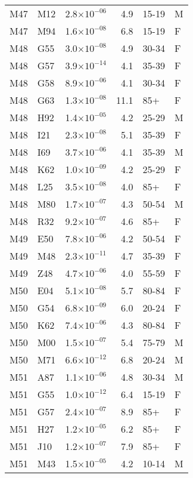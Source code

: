 \begin{longtable}{lllrll}
   M47 & M12 & 2.8$\times10^{-06}$ & 4.9 & 15-19 & M \\ 
   M47 & M94 & 1.6$\times10^{-08}$ & 6.8 & 15-19 & F \\ 
   M48 & G55 & 3.0$\times10^{-08}$ & 4.9 & 30-34 & F \\ 
   M48 & G57 & 3.9$\times10^{-14}$ & 4.1 & 35-39 & F \\ 
   M48 & G58 & 8.9$\times10^{-06}$ & 4.1 & 30-34 & F \\ 
   M48 & G63 & 1.3$\times10^{-08}$ & 11.1 & 85+ & F \\ 
   M48 & H92 & 1.4$\times10^{-05}$ & 4.2 & 25-29 & M \\ 
   M48 & I21 & 2.3$\times10^{-08}$ & 5.1 & 35-39 & F \\ 
   M48 & I69 & 3.7$\times10^{-06}$ & 4.1 & 35-39 & M \\ 
   M48 & K62 & 1.0$\times10^{-09}$ & 4.2 & 25-29 & F \\ 
   M48 & L25 & 3.5$\times10^{-08}$ & 4.0 & 85+ & F \\ 
   M48 & M80 & 1.7$\times10^{-07}$ & 4.3 & 50-54 & M \\ 
   M48 & R32 & 9.2$\times10^{-07}$ & 4.6 & 85+ & F \\ 
   M49 & E50 & 7.8$\times10^{-06}$ & 4.2 & 50-54 & F \\ 
   M49 & M48 & 2.3$\times10^{-11}$ & 4.7 & 35-39 & F \\ 
   M49 & Z48 & 4.7$\times10^{-06}$ & 4.0 & 55-59 & F \\ 
   M50 & E04 & 5.1$\times10^{-08}$ & 5.7 & 80-84 & F \\ 
   M50 & G54 & 6.8$\times10^{-09}$ & 6.0 & 20-24 & F \\ 
   M50 & K62 & 7.4$\times10^{-06}$ & 4.3 & 80-84 & F \\ 
   M50 & M00 & 1.5$\times10^{-07}$ & 5.4 & 75-79 & M \\ 
   M50 & M71 & 6.6$\times10^{-12}$ & 6.8 & 20-24 & M \\ 
   M51 & A87 & 1.1$\times10^{-06}$ & 4.8 & 30-34 & M \\ 
   M51 & G55 & 1.0$\times10^{-12}$ & 6.4 & 15-19 & F \\ 
   M51 & G57 & 2.4$\times10^{-07}$ & 8.9 & 85+ & F \\ 
   M51 & H27 & 1.2$\times10^{-05}$ & 6.2 & 85+ & F \\ 
   M51 & J10 & 1.2$\times10^{-07}$ & 7.9 & 85+ & F \\ 
   M51 & M43 & 1.5$\times10^{-05}$ & 4.2 & 10-14 & M \\ 

\end{longtable}
